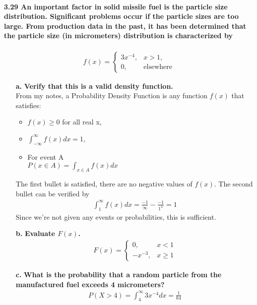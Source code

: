 \documentclass{article}
\begin{document}
\paragraph{3.29 An important factor in solid missile fuel is the particle size 
distribution. Significant problems occur if the particle sizes are too large. 
From production data in the past, it has been determined that the particle size 
(in micrometers) distribution is characterized by}
\begin{eqnarray*}
f(x) = \left\{ \begin{array}{ll}
	3x^{-4}, & x>1,\\
	0, & \mbox{elsewhere}
	\end{array} \right.
\end{eqnarray*}
\begin{enumerate}
\item[\textbf{a.}] \textbf{Verify that this is a valid density function.\\}
From my notes, a Probability Density Function is any function $f(x)$ that
satisfies:
\begin{itemize}
\item $f(x) \geq 0$ for all real x,
\item $\int_{-\infty}^\infty f(x)dx = 1$,
\item For event A\\
	$P(x \in A) = \int_{x \in A} f(x)dx$
\end{itemize}
The first bullet is satisfied, there are no negative values of $f(x)$.
The second bullet can be verified by
\begin{eqnarray*}
\int_1^\infty f(x)dx = \frac{-1}{\infty} - \frac{-1}{1^4} = 1
\end{eqnarray*}
Since we're not given any events or probabilities, this is sufficient.

\pagebreak
\item[\textbf{b.}] \textbf{Evaluate $F(x)$.}
\begin{eqnarray*}
F(x) = \left\{ \begin{array}{ll}
	0, & x < 1\\
	-x^{-3}, & x \geq 1
	\end{array} \right.
\end{eqnarray*}

\item[\textbf{c.}] \textbf{What is the probability that a random particle 
from the manufactured fuel exceeds 4 micrometers?}
\begin{eqnarray*}
P(X>4) = \int_{4}^\infty 3x^{-4}dx = \frac{1}{64}
\end{eqnarray*}
\end{enumerate}
\end{document}
